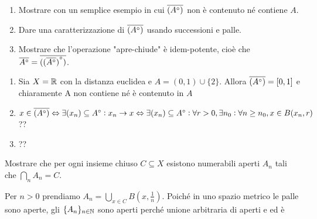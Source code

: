 \documentclass[a4paper]{article}\par \usepackage{style}\par
\begin{document}
\begin{es}
\begin{enumerate}[label = (\roman*)]
  \item Mostrare con un semplice esempio in cui $ \overline{({A}^{\circ})} $ non è contenuto né contiene $ A $.
  \item Dare una caratterizzazione di $ \overline{({A}^{\circ})} $ usando successioni e palle.
  \item Mostrare che l'operazione "apre-chiude" è idem-potente, cioè che $ \overline{{A}^{\circ}} = \overline{({(\overline{{A}^{\circ}})}^{\circ})} $.
  \end{enumerate}
\end{es}\par \begin{enumerate}[label = (\roman*)]
\item Sia $ X = \mathbb{R} $ con la distanza euclidea e $ A = (0, 1) \cup \{2\} $. Allora $ \overline{({A}^{\circ})} = [0, 1] $ e chiaramente A non contiene né è contenuto in $ A $
\item $ x \in \overline{({A}^{\circ})} \Leftrightarrow \exists (x_n) \subseteq {A}^{\circ} : x_n \to x \Leftrightarrow \exists (x_n) \subseteq {A}^{\circ} : \forall r > 0, \exists n_0 : \forall n \geq n_0, x \in B(x_n, r) $ ??
\item ??
\end{enumerate}\par \begin{es}
  Mostrare che per ogni insieme chiuso $ C \subseteq X $ esistono numerabili aperti $ A_n $ tali che $ \bigcap_{n} A_n = C $. \\
\end{es}\par Per $ n > 0 $ prendiamo $ A_n = \bigcup_{x \in C} B{\left(x, \frac{1}{n}\right)} $. Poiché in uno spazio metrico le palle sono aperte, gli $ \{A_n\}_{n \in \mathbb{N}} $ sono aperti perché unione arbitraria di aperti e ed è
\end{document}
